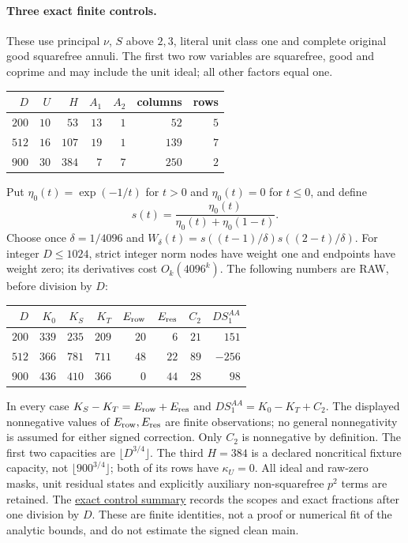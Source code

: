 \documentclass[11pt]{article}
\theoremstyle{definition}\newtheorem{definition}[theorem]{Definition}
\theoremstyle{remark}\newtheorem{remark}[theorem]{Remark}
\begin{document}
\paragraph{Three exact finite controls.}
These use principal $\nu$, $S$ above $2,3$, literal unit class one and
complete original good squarefree annuli. The first two row variables are squarefree, good and coprime and may
include the unit ideal; all other factors equal one.
\begin{center}
\begin{tabular}{r|rrrrrr}
 $D$ & $U$ & $H$ & $A_1$ & $A_2$ & columns & rows\\\hline
 $200$ & $10$ & $53$ & $13$ & $1$ & $52$ & $5$\\
 $512$ & $16$ & $107$ & $19$ & $1$ & $139$ & $7$\\
 $900$ & $30$ & $384$ & $7$ & $7$ & $250$ & $2$\\
\end{tabular}
\end{center}
Put $\eta_0(t)=\exp(-1/t)$ for $t>0$ and $\eta_0(t)=0$ for $t\le0$,
and define
\[
 s(t)=\frac{\eta_0(t)}{\eta_0(t)+\eta_0(1-t)}.
\]
Choose once $\delta=1/4096$ and
$W_\delta(t)=s((t-1)/\delta)s((2-t)/\delta)$. For integer $D\le1024$, strict integer norm nodes have
weight one and endpoints have weight zero; its derivatives cost
$O_k(4096^k)$. The following numbers are RAW, before division by $D$:
\begin{center}
\begin{tabular}{r|rrrrrrr}
 $D$ & $K_0$ & $K_S$ & $K_T$ & $E_{\rm row}$ & $E_{\rm res}$ & $C_2$
        & $DS_1^{AA}$\\\hline
 $200$ & $339$ & $235$ & $209$ & $20$ & $6$ & $21$ & $151$\\
 $512$ & $366$ & $781$ & $711$ & $48$ & $22$ & $89$ & $-256$\\
 $900$ & $436$ & $410$ & $366$ & $0$ & $44$ & $28$ & $98$\\
\end{tabular}
\end{center}
In every case $K_S-K_T=E_{\rm row}+E_{\rm res}$ and
$DS_1^{AA}=K_0-K_T+C_2$. The displayed nonnegative values of
$E_{\rm row},E_{\rm res}$ are finite observations; no general
nonnegativity is assumed for either signed correction. Only $C_2$ is
nonnegative by definition. The first two capacities are
$\lfloor D^{3/4}\rfloor$. The third $H=384$ is a declared noncritical
fixture capacity, not $\lfloor900^{3/4}\rfloor$; both of its rows have
$\kappa_U=0$. All ideal and raw-zero masks, unit residual states and
explicitly auxiliary non-squarefree $p^2$ terms are retained. The
\href{https://amelie-iska.github.io/GRH-research/data/rough-mask-controls.json}{exact control summary}
records the scopes and exact fractions after one division by $D$.
These are finite identities, not a proof or numerical fit of the analytic
bounds, and do not estimate the signed clean main.
\end{document}
